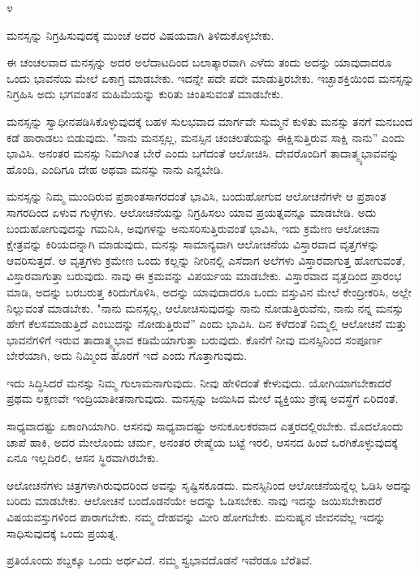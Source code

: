 \begin{center}
೪
\end{center}

ಮನಸ್ಸನ್ನು ನಿಗ್ರಹಿಸುವುದಕ್ಕೆ ಮುಂಚೆ ಅದರ ವಿಷಯವಾಗಿ ತಿಳಿದುಕೊಳ್ಳಬೇಕು.

ಈ ಚಂಚಲವಾದ ಮನಸ್ಸನ್ನು ಅದರ ಅಲೆದಾಟದಿಂದ ಬಲಾತ್ಕಾರವಾಗಿ ಎಳೆದು ತಂದು ಅದನ್ನು ಯಾವುದಾದರೂ ಒಂದು ಭಾವನೆಯ ಮೇಲೆ ಏಕಾಗ್ರ ಮಾಡಬೇಕು. ಇದನ್ನೇ ಪದೇ ಪದೇ ಮಾಡುತ್ತಿರಬೇಕು. ಇಚ್ಛಾಶಕ್ತಿಯಿಂದ ಮನಸ್ಸನ್ನು ನಿಗ್ರಹಿಸಿ ಅದು ಭಗವಂತನ ಮಹಿಮೆಯನ್ನು ಕುರಿತು ಚಿಂತಿಸುವಂತೆ ಮಾಡಬೇಕು.

ಮನಸ್ಸನ್ನು ಸ್ವಾಧೀನಪಡಿಸಿಕೊಳ್ಳುವುದಕ್ಕೆ ಬಹಳ ಸುಲಭವಾದ ಮಾರ್ಗವೇ ಸುಮ್ಮನೆ ಕುಳಿತು ಮನಸ್ಸು ತನಗೆ ಮನಬಂದ ಕಡೆ ಹಾರಾಡಲು ಬಿಡುವುದು. "ನಾನು ಮನಸ್ಸಲ್ಲ, ಮನಸ್ಸಿನ ಚಂಚಲತೆಯನ್ನು ಈಕ್ಷಿಸುತ್ತಿರುವ ಸಾಕ್ಷಿ ನಾನು'' ಎಂದು ಭಾವಿಸಿ. ಅನಂತರ ಮನಸ್ಸು ನಿಮಗಿಂತ ಬೇರೆ ಎಂದು ಬಗೆದಂತೆ ಆಲೋಚಿಸಿ. ದೇವರೊಂದಿಗೆ ತಾದಾತ್ಮ್ಯಭಾವವನ್ನು ಹೊಂದಿ, ಎಂದಿಗೂ ದೇಹ ಅಥವಾ ಮನಸ್ಸು ನಾನು ಎನ್ನಬೇಡಿ.

ಮನಸ್ಸನ್ನು ನಿಮ್ಮ ಮುಂದಿರುವ ಪ್ರಶಾಂತಸಾಗರದಂತೆ ಭಾವಿಸಿ, ಬಂದುಹೋಗುವ ಆಲೋಚನೆಗಳೇ ಆ ಪ್ರಶಾಂತ ಸಾಗರದಿಂದ ಏಳುವ ಗುಳ್ಳೆಗಳು. ಆಲೋಚನೆಯನ್ನು ನಿಗ್ರಹಿಸಲು ಯಾವ ಪ್ರಯತ್ನವನ್ನೂ ಮಾಡಬೇಡಿ. ಅದು ಬಂದುಹೋಗುವುದನ್ನು ಗಮನಿಸಿ, ಅವುಗಳನ್ನು ಅನುಸರಿಸುತ್ತಿರುವಂತೆ ಭಾವಿಸಿ, ಇದು ಕ್ರಮೇಣ ಆಲೋಚನಾ ಕ್ಷೇತ್ರವನ್ನು ಕಿರಿಯದನ್ನಾಗಿ ಮಾಡುವುದು, ಮನಸ್ಸು ಸಾಮಾನ್ಯವಾಗಿ ಆಲೋಚನೆಯ ವಿಸ್ತಾರವಾದ ವೃತ್ತಗಳನ್ನು ಆವರಿಸುತ್ತದೆ. ಆ ವೃತ್ತಗಳು ಕ್ರಮೇಣ ಒಂದು ಕಲ್ಲನ್ನು ನೀರಿನಲ್ಲಿ ಎಸೆದಾಗ ಅಲೆಗಳು ವಿಸ್ತಾರವಾಗುತ್ತ ಹೋಗುವಂತೆ, ವಿಸ್ತಾರವಾಗುತ್ತಾ ಬರುವುದು. ನಾವು ಈ ಕ್ರಮವನ್ನು ವಿಪರ್ಯಯ ಮಾಡಬೇಕು. ವಿಸ್ತಾರವಾದ ವೃತ್ತದಿಂದ ಪ್ರಾರಂಭ ಮಾಡಿ, ಅದನ್ನು ಬರಬರುತ್ತ ಕಿರಿದುಗೊಳಿಸಿ, ಅದನ್ನು ಯಾವುದಾದರೂ ಒಂದು ವಸ್ತುವಿನ ಮೇಲೆ ಕೇಂದ್ರೀಕರಿಸಿ, ಅಲ್ಲೇ ನಿಲ್ಲುವಂತೆ ಮಾಡಬೇಕು. "ನಾನು ಮನಸ್ಸಲ್ಲ, ಆಲೋಚಿಸುವುದನ್ನು ನಾನು ನೋಡುತ್ತಿರುವೆನು, ನಾನು ನನ್ನ ಮನಸ್ಸು ಹೇಗೆ ಕೆಲಸಮಾಡುತ್ತಿದೆ ಎಂಬುದನ್ನು ನೋಡುತ್ತಿರುವೆ'' ಎಂದು ಭಾವಿಸಿ. ದಿನ ಕಳೆದಂತೆ ನಿಮ್ಮಲ್ಲಿ ಆಲೋಚನೆ ಮತ್ತು ಭಾವನೆಗಳಿಗೆ ಇರುವ ತಾದಾತ್ಮ್ಯಭಾವ ಕಡಿಮೆಯಾಗುತ್ತಾ ಬರುವುದು. ಕೊನೆಗೆ ನೀವು ಮನಸ್ಸಿನಿಂದ ಸಂಪೂರ್ಣ ಬೇರೆಯಾಗಿ, ಅದು ನಿಮ್ಮಿಂದ ಹೊರಗೆ ಇದೆ ಎಂದು ಗೊತ್ತಾಗುವುದು.

ಇದು ಸಿದ್ಧಿಸಿದರೆ ಮನಸ್ಸು ನಿಮ್ಮ ಗುಲಾಮನಾಗುವುದು. ನೀವು ಹೇಳಿದಂತೆ ಕೇಳುವುದು. ಯೋಗಿಯಾಗಬೇಕಾದರೆ ಪ್ರಥಮ ಲಕ್ಷಣವೇ ಇಂದ್ರಿಯಾತೀತನಾಗುವುದು. ಮನಸ್ಸನ್ನು ಜಯಿಸಿದ ಮೇಲೆ ವ್ಯಕ್ತಿಯು ಶ್ರೇಷ್ಠ ಅವಸ್ಥೆಗೆ ಏರಿದಂತೆ.

ಸಾಧ್ಯವಾದಷ್ಟು ಏಕಾಂಗಿಯಾಗಿರಿ. ಆಸನವು ಸಾಧ್ಯವಾದಷ್ಟು ಅನುಕೂಲಕರವಾದ ಎತ್ತರದಲ್ಲಿರಬೇಕು. ಮೊದಲೊಂದು ಚಾಪೆ ಹಾಕಿ, ಅದರ ಮೇಲೊಂದು ಚರ್ಮ, ಅನಂತರ ರೇಷ್ಮೆಯ ಬಟ್ಟೆ ಇರಲಿ, ಆಸನದ ಹಿಂದೆ ಒರಗಿಕೊಳ್ಳುವುದಕ್ಕೆ ಏನೂ ಇಲ್ಲದಿರಲಿ, ಆಸನ ಸ್ಥಿರವಾಗಿರಬೇಕು.

ಆಲೋಚನೆಗಳು ಚಿತ್ರಗಳಾಗಿರುವುದರಿಂದ ಅವನ್ನು ಸೃಷ್ಟಿಸಕೂಡದು. ಮನಸ್ಸಿನಿಂದ ಆಲೋಚನೆಯನ್ನೆಲ್ಲ ಓಡಿಸಿ ಅದನ್ನು ಬರಿದು ಮಾಡಬೇಕು. ಆಲೋಚನೆ ಬಂದೊಡನೆಯೇ ಅದನ್ನು ಓಡಿಸಬೇಕು. ನಾವು ಇದನ್ನು ಜಯಿಸಬೇಕಾದರೆ ವಿಷಯವಸ್ತುಗಳಿಂದ ಪಾರಾಗಬೇಕು. ನಮ್ಮ ದೇಹವನ್ನು ಮೀರಿ ಹೋಗಬೇಕು. ಮನುಷ್ಯನ ಜೀವನವೆಲ್ಲ ಇದನ್ನು ಸಾಧಿಸುವುದಕ್ಕೆ ಒಂದು ಪ್ರಯತ್ನ.

ಪ್ರತಿಯೊಂದು ಶಬ್ದಕ್ಕೂ ಒಂದು ಅರ್ಥವಿದೆ. ನಮ್ಮ ಸ್ವಭಾವದೊಡನೆ ಇವೆರಡೂ ಬೆರೆತಿವೆ.

